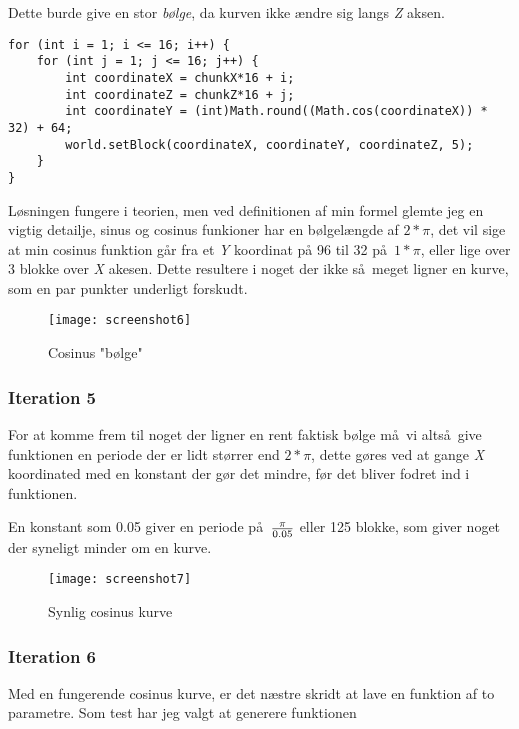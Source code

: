 \documentclass[a4paper,12pt]{report}
\begin{document}
			Dette burde give en stor \emph{b\o lge}, da kurven ikke \ae ndre sig langs \emph{Z} aksen.

\begin{lstlisting}[label=SRPWorldGenerator2,caption=SRPWorldGenerator.java]
for (int i = 1; i <= 16; i++) {
    for (int j = 1; j <= 16; j++) {
        int coordinateX = chunkX*16 + i;
        int coordinateZ = chunkZ*16 + j;
        int coordinateY = (int)Math.round((Math.cos(coordinateX)) * 32) + 64;
        world.setBlock(coordinateX, coordinateY, coordinateZ, 5);
    }
}
\end{lstlisting}
	
			L\o sningen fungere i teorien, men ved definitionen af min formel glemte jeg en vigtig detailje, sinus og cosinus funkioner har
			en b\o lgel\ae ngde af \(2 * \pi \), det vil sige at min cosinus funktion g\aa r fra et \emph{Y} koordinat på 96 til 32 p\aa \ \(1 * \pi \),
			eller lige over 3 blokke over \emph{X} akesen. Dette resultere i noget der ikke s\aa \ meget ligner en kurve, som en par punkter underligt
			forskudt.

			\begin{wrapfigure}{r}{0.5\textwidth}
				\texttt{[image: screenshot6]}
				\caption{Cosinus "b\o lge"}
			\end{wrapfigure}

		\subsubsection{Iteration 5}
			For at komme frem til noget der ligner en rent faktisk b\o lge m\aa \ vi alts\aa \ give funktionen en periode der er lidt st\o rrer
			end \(2 * \pi \), dette gøres ved at gange \emph{X} koordinated med en konstant der g\o r det mindre, f\o r det bliver fodret
			ind i funktionen.

			En konstant som 0.05 giver en periode p\aa \ \( \pi \over 0.05\) eller 125 blokke, som giver noget der syneligt
			minder om en kurve.

			\begin{wrapfigure}{r}{0.5\textwidth}
				\texttt{[image: screenshot7]}
				\caption{Synlig cosinus kurve}
			\end{wrapfigure}

		 \subsubsection{Iteration 6}
			Med en fungerende cosinus kurve, er det n\ae stre skridt at lave en funktion af to parametre.
			Som test har jeg valgt at generere funktionen
\end{document}
